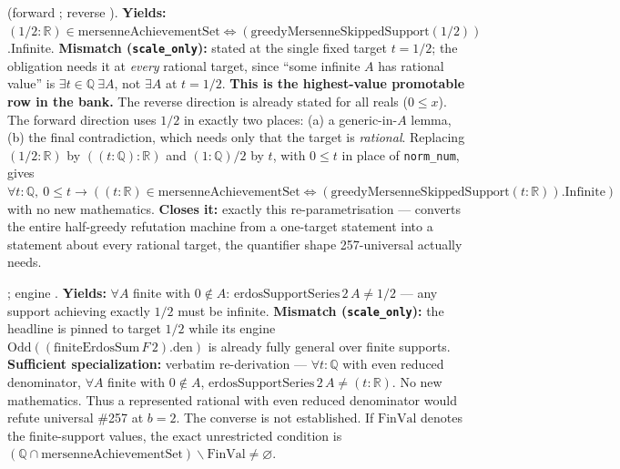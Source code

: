 \begin{obs} 
(forward ; reverse
).
\textbf{Yields:} $(1/2:\mathbb R)\in\mathrm{mersenneAchievementSet} \Leftrightarrow
(\mathrm{greedyMersenneSkippedSupport}(1/2))$.Infinite.
\textbf{Mismatch (\texttt{scale\_only}):} stated at the single fixed target $t=1/2$; the
obligation needs it at \emph{every} rational target, since ``some infinite $A$ has rational
value'' is $\exists t\in\mathbb Q\ \exists A$, not $\exists A$ at $t{=}1/2$.
\textbf{This is the highest-value promotable row in the bank.} The reverse direction is already
stated for all reals ($0\le x$). The forward direction uses $1/2$ in exactly two places: (a) a
generic-in-$A$ lemma, (b) the final contradiction, which needs only that the target is
\emph{rational}. Replacing $(1/2:\mathbb R)$ by $((t:\mathbb Q):\mathbb R)$ and $(1:\mathbb Q)/2$
by $t$, with $0\le t$ in place of \texttt{norm\_num}, gives $\forall t:\mathbb Q,\ 0\le t \to
((t:\mathbb R)\in\mathrm{mersenneAchievementSet} \Leftrightarrow
(\mathrm{greedyMersenneSkippedSupport}(t:\mathbb R))\text{.Infinite})$ with no new mathematics.
\textbf{Closes it:} exactly this re-parametrisation — converts the entire half-greedy refutation
machine from a one-target statement into a statement about every rational target, the quantifier
shape 257-universal actually needs.
\end{obs}

\begin{obs} 
; engine
.
\textbf{Yields:} $\forall A$ finite with $0\notin A$: $\mathrm{erdosSupportSeries}\,2\,A \ne
1/2$ — any support achieving exactly $1/2$ must be infinite.
\textbf{Mismatch (\texttt{scale\_only}):} the headline is pinned to target $1/2$ while its engine
$\mathrm{Odd}((\mathrm{finiteErdosSum}\,F\,2).\mathrm{den})$ is already fully general over finite
supports.
\textbf{Sufficient specialization:} verbatim re-derivation — $\forall t:\mathbb Q$ with even reduced denominator,
$\forall A$ finite with $0\notin A$, $\mathrm{erdosSupportSeries}\,2\,A \ne (t:\mathbb R)$. No new
mathematics. Thus a represented rational with even reduced denominator would refute universal
\#257 at $b=2$. The converse is not established. If $\mathrm{FinVal}$ denotes the finite-support
values, the exact unrestricted condition is
$(\mathbb Q\cap\mathrm{mersenneAchievementSet})\smallsetminus\mathrm{FinVal}\ne\varnothing$.
\end{obs}

